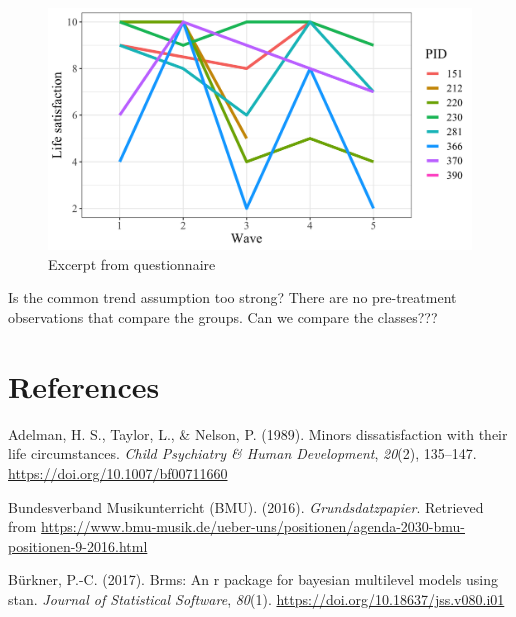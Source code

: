 \documentclass[a4, 12pt]{article}
\begin{document}
\begin{figure}[H]

{\centering \includegraphics[width=0.8\linewidth,]{../figures/random_lsat} 

}

\caption{Excerpt from questionnaire}\label{fig:random-pid}
\end{figure}

Is the common trend assumption too strong? There are no pre-treatment observations that compare the groups. Can we compare the classes???

\clearpage

\hypertarget{references}{%
\section*{References}\label{references}}

\singlespacing

\setlength{\parindent}{-0.5in}
\setlength{\leftskip}{0.5in}
\setlength{\parskip}{8pt}

\noindent

\hypertarget{refs}{}
\leavevmode\hypertarget{ref-Adelman1989}{}%
Adelman, H. S., Taylor, L., \& Nelson, P. (1989). Minors dissatisfaction with their life circumstances. \emph{Child Psychiatry \& Human Development}, \emph{20}(2), 135--147. \url{https://doi.org/10.1007/bf00711660}

\leavevmode\hypertarget{ref-BundesverbandMusikunterricht}{}%
Bundesverband Musikunterricht (BMU). (2016). \emph{Grundsdatzpapier}. Retrieved from \url{https://www.bmu-musik.de/ueber-uns/positionen/agenda-2030-bmu-positionen-9-2016.html}

\leavevmode\hypertarget{ref-Buerkner2017}{}%
Bürkner, P.-C. (2017). Brms: An r package for bayesian multilevel models using stan. \emph{Journal of Statistical Software}, \emph{80}(1). \url{https://doi.org/10.18637/jss.v080.i01}
\end{document}
